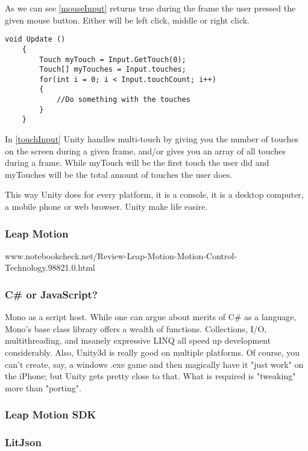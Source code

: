 As we can see \autoref{mouseInput}  returns true during the frame the user pressed the given mouse button. Either will be left click, middle or right click.

\begin{lstlisting}[caption={Multiple touch input for mobile application in Unity \cite{multipletouch}.},label={touchInput}]
void Update () 
    {
        Touch myTouch = Input.GetTouch(0);
        Touch[] myTouches = Input.touches;
        for(int i = 0; i < Input.touchCount; i++)
        {
            //Do something with the touches
        }
    }
\end{lstlisting}

In \autoref{touchInput} Unity handles multi-touch by giving you the number of touches on the screen during a given frame, and/or gives you an array of all touches during a frame. While myTouch will be the first touch the user did and myTouches will be the total amount of touches the user does.

This way Unity does for every platform, it is a console, it is a desktop computer, a mobile phone or web browser. Unity make life easire.
\subsubsection {Leap Motion}



www.notebookcheck.net/Review-Leap-Motion-Motion-Control-Technology.98821.0.html
\subsubsection {C\# or JavaScript?}

Mono as a script host. While one can argue about merits of C\# as a language, Mono's base class library offers a wealth of functions. Collections, I/O, multithreading, and insanely expressive LINQ all speed up development considerably.
Also, Unity3d is really good on multiple platforms. Of course, you can't create, say, a windows .exe game and then magically have it "just work" on the iPhone; but Unity gets pretty close to that. What is required is "tweaking" more than "porting".
\subsubsection {Leap Motion SDK}
\subsubsection {LitJson}
